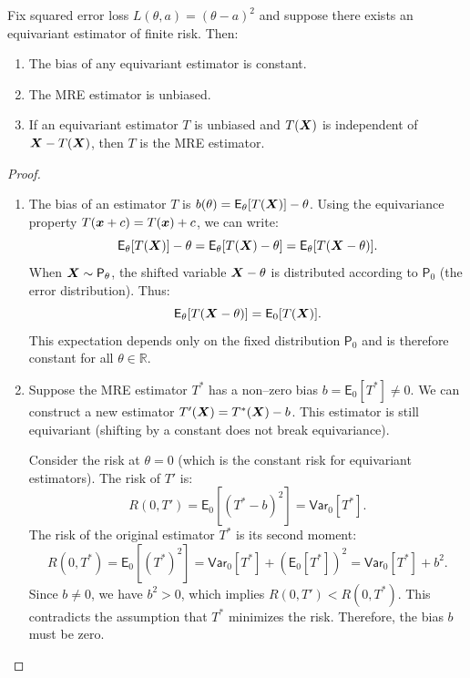 \begin{pro}
\label{prop:mre_unbiasedness}
Fix squared error loss \(L(\theta, a) = (\theta - a)^2\) and suppose there exists an equivariant estimator of finite risk. Then:
\begin{enumerate}
    \item[(i)] The bias of any equivariant estimator is constant.
    \item[(ii)] The MRE estimator is unbiased.
    \item[(iii)] If an equivariant estimator \(T\) is unbiased and \(T(\boldsymbol{X})\) is independent of \(\boldsymbol{X} - T(\boldsymbol{X})\), then \(T\) is the MRE estimator.
\end{enumerate}
\end{pro}

\begin{proof}
    \leavevmode
\begin{enumerate}
    \item[(i)] The bias of an estimator \(T\) is \(b(\theta) = \mathsf{E}_{\theta}[T(\boldsymbol{X})] - \theta\). Using the equivariance property \(T(\boldsymbol{x} + c) = T(\boldsymbol{x}) + c\), we can write:
    \[
    \mathsf{E}_{\theta}[T(\boldsymbol{X})] - \theta = \mathsf{E}_{\theta}[T(\boldsymbol{X}) - \theta] = \mathsf{E}_{\theta}[T(\boldsymbol{X} - \theta)].
    \]
    When \(\boldsymbol{X} \sim \mathsf{P}_\theta\), the shifted variable \(\boldsymbol{X} - \theta\) is distributed according to \(\mathsf{P}_0\) (the error distribution). Thus:
    \[
    \mathsf{E}_{\theta}[T(\boldsymbol{X} - \theta)] = \mathsf{E}_{0}[T(\boldsymbol{X})].
    \]
    This expectation depends only on the fixed distribution \(\mathsf{P}_0\) and is therefore constant for all \(\theta \in \mathbb{R}\).

    \item[(ii)] Suppose the MRE estimator \(T^*\) has a non--zero bias \(b = \mathsf{E}_0[T^*] \neq 0\). We can construct a new estimator \(T'(\boldsymbol{X}) = T^*(\boldsymbol{X}) - b\). This estimator is still equivariant (shifting by a constant does not break equivariance).
    
    Consider the risk at \(\theta=0\) (which is the constant risk for equivariant estimators). The risk of \(T'\) is:
    \[
    R(0, T') = \mathsf{E}_0[(T^* - b)^2] = \mathsf{Var}_0[T^*].
    \]
    The risk of the original estimator \(T^*\) is its second moment:
    \[
    R(0, T^*) = \mathsf{E}_0[(T^*)^2] = \mathsf{Var}_0[T^*] + (\mathsf{E}_0[T^*])^2 = \mathsf{Var}_0[T^*] + b^2.
    \]
    Since \(b \neq 0\), we have \(b^2 > 0\), which implies \(R(0, T') < R(0, T^*)\). This contradicts the assumption that \(T^*\) minimizes the risk. Therefore, the bias \(b\) must be zero.


\end{enumerate}
\end{proof}
